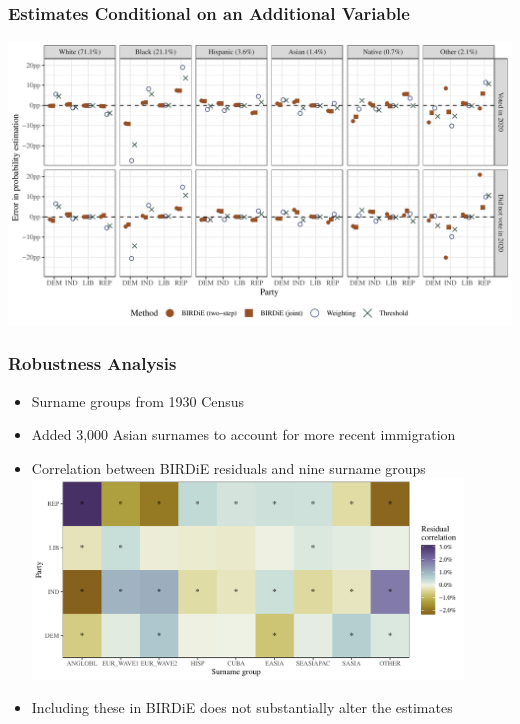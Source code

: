 \documentclass{beamer}
\begin{document}
\begin{frame}

  \frametitle{Estimates Conditional on an Additional Variable}

 \includegraphics[width=\textwidth]{../paper/figures/nc_addlcov_error.pdf}


\end{frame}

\begin{frame}

  \frametitle{Robustness Analysis}

  \begin{itemize}
  \item Surname groups from 1930 Census  
  \item Added 3,000 Asian surnames to account for more recent
    immigration
    \vfill
  \item Correlation between BIRDiE residuals and nine surname groups
    \includegraphics[width=0.9\textwidth]{../paper/figures/nc_sens_grp.pdf}

  \item Including these in BIRDiE does not substantially alter the estimates 
  \end{itemize}

\end{frame}
\end{document}
